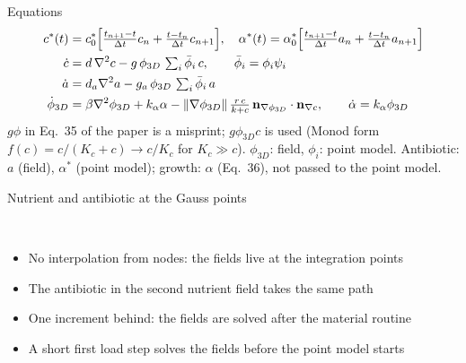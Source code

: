 \documentclass[aspectratio=169,11pt]{beamer}
\begin{document}
\begin{frame}{Equations}
\begin{align*}
c^*(t)&=c^*_0\Bigl[\tfrac{t_{n+1}-t}{\Delta t}c_n+\tfrac{t-t_n}{\Delta t}c_{n+1}\Bigr],\quad
\alpha^*(t)=\alpha^*_0\Bigl[\tfrac{t_{n+1}-t}{\Delta t}a_n+\tfrac{t-t_n}{\Delta t}a_{n+1}\Bigr]\\
\dot c&=d\,\nabla^2c-g\,\phi_{3D}\,\textstyle\sum_i\bar\phi_i\,c,\qquad \bar\phi_i=\phi_i\psi_i\\
\dot a&=d_a\nabla^2a-g_a\,\phi_{3D}\,\textstyle\sum_i\bar\phi_i\,a\\
\dot\phi_{3D}&=\beta\nabla^2\phi_{3D}+k_\alpha\alpha-\|\nabla\phi_{3D}\|\,\tfrac{r\,c}{k+c}\,\mathbf n_{\nabla\phi_{3D}}\cdot\mathbf n_{\nabla c},
\qquad \dot\alpha=k_\alpha\phi_{3D}
\end{align*}
\small $g\phi$ in Eq.\ 35 of the paper is a misprint; $g\phi_{3D}c$ is used (Monod form $f(c)=c/(K_c+c)\to c/K_c$ for $K_c\gg c$). $\phi_{3D}$: field, $\phi_i$: point model. Antibiotic: $a$ (field), $\alpha^*$ (point model); growth: $\alpha$ (Eq.\ 36), not passed to the point model.
\end{frame}

\begin{frame}{Nutrient and antibiotic at the Gauss points}
\centering
{}\\[10pt]
\begin{itemize}\setlength{\itemsep}{4pt}
  \item No interpolation from nodes: the fields live at the integration points
  \item The antibiotic in the second nutrient field takes the same path
  \item One increment behind: the fields are solved after the material routine
  \item A short first load step solves the fields before the point model starts
\end{itemize}
\end{frame}
\end{document}
